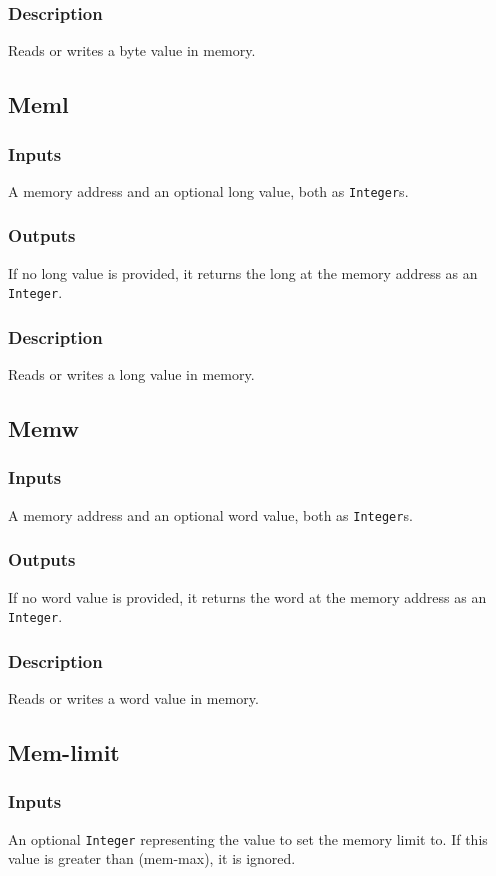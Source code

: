 \documentclass[10pt, openany]{book}
\newcommand{\datatype}[1]{\texttt{#1}}
\begin{document}
\subsubsection{Description}
Reads or writes a byte value in memory.

\subsection{Meml}
\subsubsection{Inputs}
A memory address and an optional long value, both as \datatype{Integer}s.
\subsubsection{Outputs}
If no long value is provided, it returns the long at the memory address as an \datatype{Integer}.
\subsubsection{Description}
Reads or writes a long value in memory.

\subsection{Memw}
\subsubsection{Inputs}
A memory address and an optional word value, both as \datatype{Integer}s.
\subsubsection{Outputs}
If no word value is provided, it returns the word at the memory address as an \datatype{Integer}.
\subsubsection{Description}
Reads or writes a word value in memory.

\subsection{Mem-limit}
\subsubsection{Inputs}
An optional \datatype{Integer} representing the value to set the memory limit to.
If this value is greater than (mem-max), it is ignored.
\end{document}
